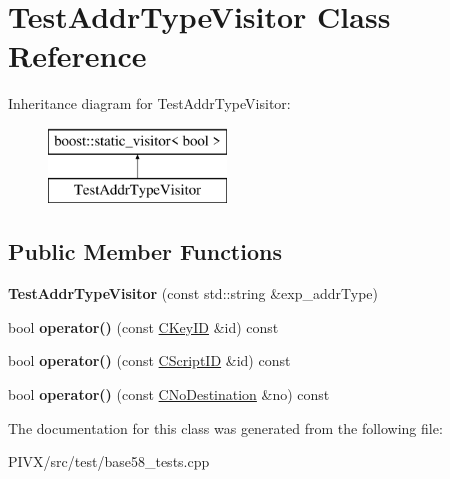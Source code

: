 \hypertarget{class_test_addr_type_visitor}{}\section{Test\+Addr\+Type\+Visitor Class Reference}
\label{class_test_addr_type_visitor}
Inheritance diagram for Test\+Addr\+Type\+Visitor\+:\begin{figure}[H]
\begin{center}
\leavevmode
\includegraphics[height=2.000000cm]{class_test_addr_type_visitor}
\end{center}
\end{figure}
\subsection*{Public Member Functions}
\begin{DoxyCompactItemize}
\item 
\mbox{\label{class_test_addr_type_visitor_ae60ae920ab6c864c5543a9a795fde74a}} 
{\bfseries Test\+Addr\+Type\+Visitor} (const std\+::string \&exp\+\_\+addr\+Type)
\item 
\mbox{\label{class_test_addr_type_visitor_a9ee55bb56a6f5a8910c4913db7e66924}} 
bool {\bfseries operator()} (const \mbox{\hyperlink{class_c_key_i_d}{C\+Key\+ID}} \&id) const
\item 
\mbox{\label{class_test_addr_type_visitor_a62c5864d0b089a969158c08f64c321f6}} 
bool {\bfseries operator()} (const \mbox{\hyperlink{class_c_script_i_d}{C\+Script\+ID}} \&id) const
\item 
\mbox{\label{class_test_addr_type_visitor_af4326f111cf9977e02593edea996afba}} 
bool {\bfseries operator()} (const \mbox{\hyperlink{class_c_no_destination}{C\+No\+Destination}} \&no) const
\end{DoxyCompactItemize}


The documentation for this class was generated from the following file\+:\begin{DoxyCompactItemize}
\item 
P\+I\+V\+X/src/test/base58\+\_\+tests.\+cpp\end{DoxyCompactItemize}
